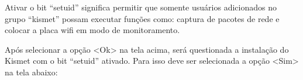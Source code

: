 Ativar o bit ``setuid'' significa permitir que somente usuários adicionados no grupo ``kismet'' possam executar funções como: captura de pacotes de rede e colocar a placa wifi em modo de monitoramento.

\begin{figure}[h!]
	\centering
\end{figure}

Após selecionar a opção <Ok> na tela acima, será questionada a instalação do Kismet com o bit ``setuid'' ativado. Para isso deve ser selecionada a opção <Sim> na tela abaixo:

\begin{figure}[h!]
	\centering
\end{figure}

